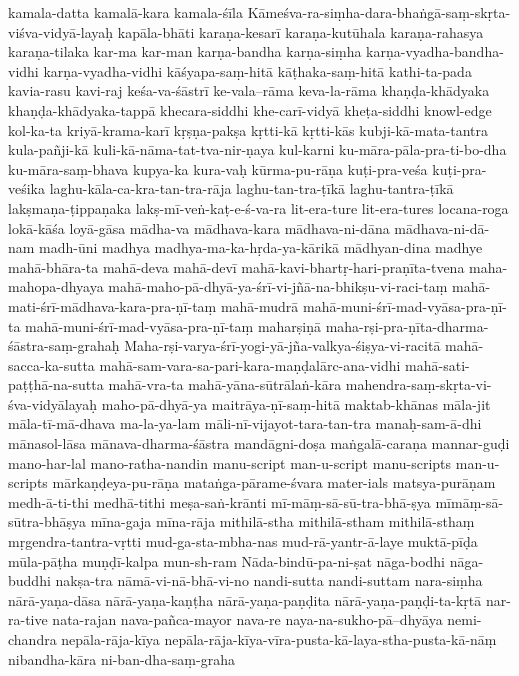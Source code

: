 {kamala-datta
kamalā-kara
    kamala-śīla 
Kāmeśva-ra-siṃha-dara-bhaṅgā-saṃ-skṛta-viśva-vidyā-layaḥ
kapāla-bhāti
karaṇa-kesarī
karaṇa-kutūhala
karaṇa-rahasya
karaṇa-tilaka
kar-ma
kar-man
karṇa-bandha
karṇa-siṃha
karṇa-vyadha-bandha-vidhi
karṇa-vyadha-vidhi
kāśyapa-saṃ-hitā
kāṭhaka-saṃ-hitā
kathi-ta-pada
kavia-rasu
kavi-raj
keśa-va-śāstrī
ke-vala--rāma
keva-la-rāma
khaṇḍa-khādyaka
khaṇḍa-khādyaka-tappā
khecara-siddhi
khe-carī-vidyā
kheṭa-siddhi
knowl-edge
kol-ka-ta
kriyā-krama-karī
kṛṣṇa-pakṣa
kṛtti-kā
kṛtti-kās
kubji-kā-mata-tantra
kula-pañji-kā
    kuli-kā-nāma-tat-tva-nir-ṇaya
kul-karni
ku-māra-pāla-pra-ti-bo-dha
ku-māra-saṃ-bhava
kupya-ka
    kura-vaḥ
    kūrma-pu-rāṇa 
kuṭi-pra-veśa
kuṭi-pra-veśika
    laghu-kāla-ca-kra-tan-tra-rāja
    laghu-tan-tra-ṭīkā
laghu-tantra-ṭīkā
lakṣmaṇa-ṭippaṇaka
lakṣ-mī-veṅ-kaṭ-e-ś-va-ra
lit-era-ture
lit-era-tures
locana-roga
lokā-kāśa
loyā-gāsa
mādha-va
mādhava-kara
mādhava-ni-dāna
mādhava-ni-dā-nam
madh-ūni
madhya
    madhya-ma-ka-hṛda-ya-kārikā
mādhyan-dina
madhye
mahā-bhāra-ta
mahā-deva
mahā-devī
mahā-kavi-bhartṛ-hari-praṇīta-tvena
maha-mahopa-dhyaya
mahā-maho-pā-dhyā-ya-śrī-vi-jñā-na-bhikṣu-vi-raci-taṃ
mahā-mati-śrī-mādhava-kara-pra-ṇī-taṃ
mahā-mudrā
mahā-muni-śrī-mad-vyāsa-pra-ṇī-ta
mahā-muni-śrī-mad-vyāsa-pra-ṇī-taṃ
maharṣiṇā
maha-rṣi-pra-ṇīta-dharma-śāstra-saṃ-grahaḥ
Maha-rṣi-varya-śrī-yogi-yā-jña-valkya-śiṣya-vi-racitā
mahā-sacca-ka-sutta
    mahā-sam-vara-sa-pari-kara-maṇḍalārc-ana-vidhi
mahā-sati-paṭṭhā-na-sutta
mahā-vra-ta
mahā-yāna-sūtrālaṅ-kāra
mahendra-saṃ-skṛta-vi-śva-vidyālayaḥ
    maho-pā-dhyā-ya 
maitrāya-ṇī-saṃ-hitā
maktab-khānas
māla-jit
    māla-tī-mā-dhava
    ma-la-ya-lam
māli-nī-vijayot-tara-tan-tra
manaḥ-sam-ā-dhi
mānasol-lāsa
mānava-dharma-śāstra
mandāgni-doṣa
maṅgalā-caraṇa
mannar-guḍi
mano-har-lal
mano-ratha-nandin
    manu-script
man-u-script
    manu-scripts
man-u-scripts
    mārkaṇḍeya-pu-rāṇa 
mataṅga-pārame-śvara
mater-ials
matsya-purāṇam
medh-ā-ti-thi
medhā-tithi
meṣa-saṅ-krānti
    mī-māṃ-sā-sū-tra-bhā-ṣya
    mīmāṃ-sā-sūtra-bhāṣya
    mīna-gaja
mīna-rāja
mithilā-stha
mithilā-stham
mithilā-sthaṃ
mṛgendra-tantra-vṛtti
    mud-ga-sta-mbha-nas
mud-rā-yantr-ā-laye
muktā-pīḍa
mūla-pāṭha
muṇḍī-kalpa
mun-sh-ram
Nāda-bindū-pa-ni-ṣat
nāga-bodhi
nāga-buddhi
nakṣa-tra
    nāmā-vi-nā-bhā-vi-no
nandi-sutta
nandi-suttam
nara-siṃha
nārā-yaṇa-dāsa
nārā-yaṇa-kaṇṭha
nārā-yaṇa-paṇḍita
nārā-yaṇa-paṇḍi-ta-kṛtā
nar-ra-tive
nata-rajan
nava-pañca-mayor
nava-re
naya-na-sukho-pā--dhyāya
nemi-chandra
    nepāla-rāja-kīya 
    nepāla-rāja-kīya-vīra-pusta-kā-laya-stha-pusta-kā-nāṃ
    nibandha-kāra
ni-ban-dha-saṃ-graha
}
